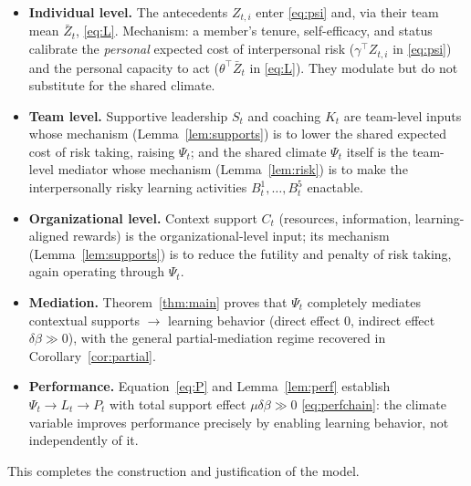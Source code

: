 \documentclass{amsart}
\theoremstyle{definition}
\theoremstyle{remark}
\begin{document}
\begin{itemize}
\item \textbf{Individual level.} The antecedents $Z_{t,i}$ enter
\eqref{eq:psi} and, via their team mean $\bar Z_t$, \eqref{eq:L}.
Mechanism: a member's tenure, self-efficacy, and status calibrate the
\emph{personal} expected cost of interpersonal risk
($\gamma^\top Z_{t,i}$ in \eqref{eq:psi}) and the personal capacity to act
($\theta^\top\bar Z_t$ in \eqref{eq:L}). They modulate but do not
substitute for the shared climate.

\item \textbf{Team level.} Supportive leadership $S_t$ and coaching $K_t$
are team-level inputs whose mechanism (Lemma~\ref{lem:supports}) is to
lower the shared expected cost of risk taking, raising $\Psi_t$; and the
shared climate $\Psi_t$ itself is the team-level mediator whose mechanism
(Lemma~\ref{lem:risk}) is to make the interpersonally risky learning
activities $B_t^1,\dots,B_t^5$ enactable.

\item \textbf{Organizational level.} Context support $C_t$
(resources, information, learning-aligned rewards) is the
organizational-level input; its mechanism (Lemma~\ref{lem:supports}) is to
reduce the futility and penalty of risk taking, again operating through
$\Psi_t$.

\item \textbf{Mediation.} Theorem~\ref{thm:main} proves that
$\Psi_t$ completely mediates contextual supports $\to$ learning behavior
(direct effect $0$, indirect effect $\delta\beta\gg0$), with the general
partial-mediation regime recovered in Corollary~\ref{cor:partial}.

\item \textbf{Performance.} Equation~\eqref{eq:P} and
Lemma~\ref{lem:perf} establish $\Psi_t\to L_t\to P_t$ with total support
effect $\mu\delta\beta\gg0$ \eqref{eq:perfchain}: the climate variable
improves performance precisely by enabling learning behavior, not
independently of it.
\end{itemize}

This completes the construction and justification of the model.
\end{document}
